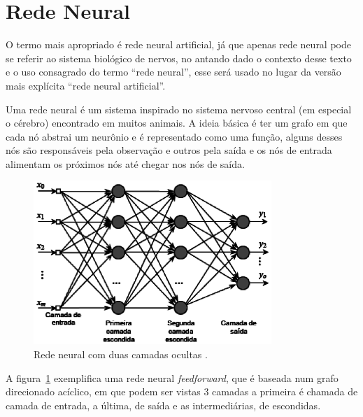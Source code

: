 \section{Rede Neural}

O termo mais apropriado é rede neural artificial, já que apenas rede
neural pode se referir ao sistema biológico de nervos, no antando dado o
contexto desse texto e o uso consagrado do termo ``rede neural'', esse
será usado no lugar da versão mais explícita ``rede neural artificial''.

Uma rede neural é um sistema inspirado no sistema nervoso central (em
especial o cérebro) encontrado em muitos animais. A ideia básica é ter
um grafo em que cada nó abstrai um neurônio e é representado como uma
função, alguns desses nós são responsáveis pela observação e outros pela
saída e os nós de entrada alimentam os próximos nós até chegar nos nós
de saída. \cite{haykin2001redes}



\begin{figure}[ht]
\centering
\includegraphics[width=9cm]{figuras/rede_neural_topologia}
\caption{Rede neural com duas camadas ocultas \cite{haykin2001redes}.}\label{fig:rede_neural_grafo}
\end{figure}

A figura~\ref{fig:rede_neural_grafo} exemplifica uma rede neural \emph{feedforward},
que é baseada num grafo direcionado acíclico, em que podem ser vistas 3 camadas
a primeira é chamada de camada de entrada, a última, de saída e as intermediárias,
de escondidas. \cite{shiffman2012nature}

